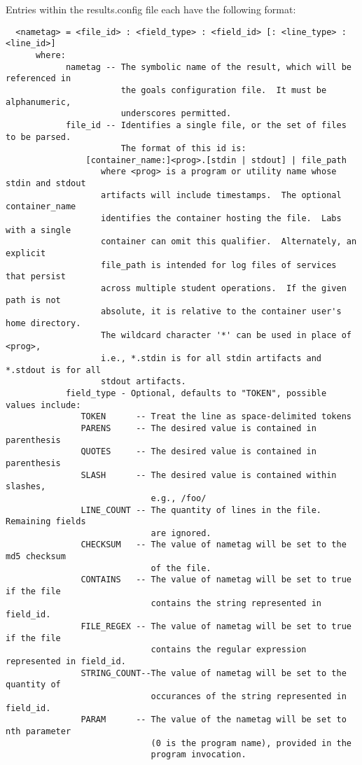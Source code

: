 \documentclass[12pt]{article}
\begin{document}
Entries within the results.config file each have the following format:

\begin{verbatim}
  <nametag> = <file_id> : <field_type> : <field_id> [: <line_type> : <line_id>]
      where:
            nametag -- The symbolic name of the result, which will be referenced in 
                       the goals configuration file.  It must be alphanumeric, 
                       underscores permitted.
            file_id -- Identifies a single file, or the set of files to be parsed.  
                       The format of this id is:
                [container_name:]<prog>.[stdin | stdout] | file_path
                   where <prog> is a program or utility name whose stdin and stdout 
                   artifacts will include timestamps.  The optional container_name 
                   identifies the container hosting the file.  Labs with a single 
                   container can omit this qualifier.  Alternately, an explicit 
                   file_path is intended for log files of services that persist 
                   across multiple student operations.  If the given path is not 
                   absolute, it is relative to the container user's home directory. 
                   The wildcard character '*' can be used in place of <prog>,
                   i.e., *.stdin is for all stdin artifacts and *.stdout is for all 
                   stdout artifacts.
            field_type - Optional, defaults to "TOKEN", possible values include:
               TOKEN      -- Treat the line as space-delimited tokens
               PARENS     -- The desired value is contained in parenthesis
               QUOTES     -- The desired value is contained in parenthesis
               SLASH      -- The desired value is contained within slashes, 
                             e.g., /foo/
               LINE_COUNT -- The quantity of lines in the file. Remaining fields 
                             are ignored.
               CHECKSUM   -- The value of nametag will be set to the md5 checksum 
                             of the file.
               CONTAINS   -- The value of nametag will be set to true if the file 
                             contains the string represented in field_id.
               FILE_REGEX -- The value of nametag will be set to true if the file 
                             contains the regular expression represented in field_id.
               STRING_COUNT--The value of nametag will be set to the quantity of
                             occurances of the string represented in field_id.
               PARAM      -- The value of the nametag will be set to nth parameter
                             (0 is the program name), provided in the 
                             program invocation.  
                             

\end{verbatim}
\end{document}
